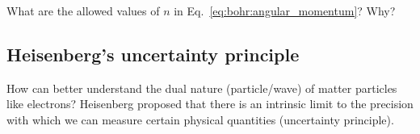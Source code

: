 
\begin{exercise}
What are the allowed values of $n$ in Eq.~\eqref{eq:bohr:angular_momentum}? Why?
\end{exercise}

\subsection{Heisenberg's uncertainty principle}
How can better understand the dual nature (particle/wave) of matter particles like electrons?
Heisenberg proposed that there is an intrinsic limit to the precision with which we can measure certain physical quantities (uncertainty principle).

